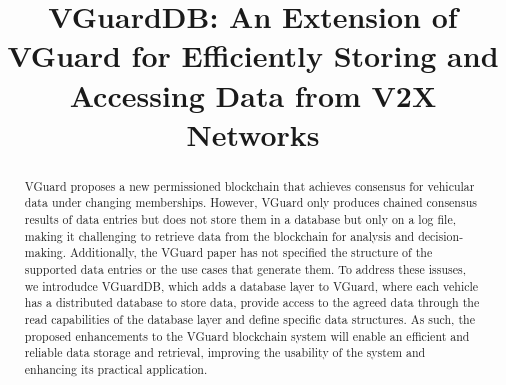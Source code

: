 \usepackage{filecontents}




\title{VGuardDB: An Extension of VGuard for Efficiently Storing and Accessing Data from V2X Networks}

\maketitle

\begin{abstract}
VGuard proposes a new permissioned blockchain that achieves consensus for vehicular data under changing memberships. However, VGuard only produces chained consensus results of data entries but does not store them in a database but only on a log file, making it challenging to retrieve data from the blockchain for analysis and decision-making. Additionally, the VGuard paper has not specified the structure of the supported data entries or the use cases that generate them. To address these issuses, we introdudce VGuardDB, which adds a database layer to VGuard, where each vehicle has a distributed database to store data, provide access to the agreed data through the read capabilities of the database layer and define specific data structures. As such, the proposed enhancements to the VGuard blockchain system will enable an efficient and reliable data storage and retrieval, improving the usability of the system and enhancing its practical application.
\end{abstract}
